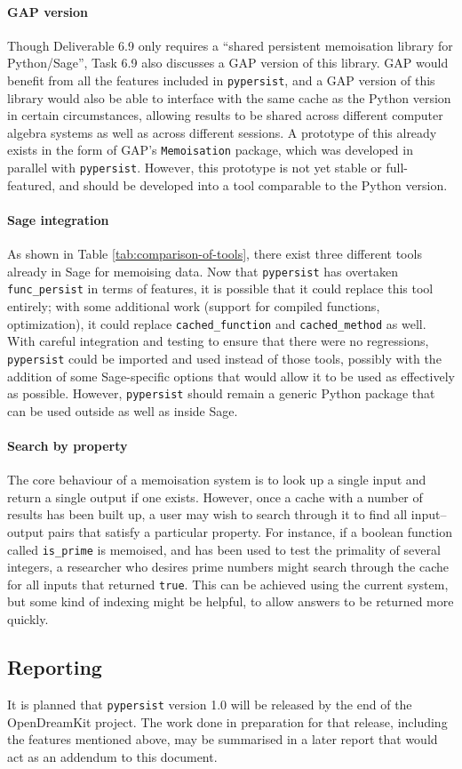 \documentclass{deliverablereport}
\newcommand{\pypersist}{\texttt{pypersist}}
\begin{document}
\paragraph{GAP version}
Though Deliverable 6.9 only requires a ``shared persistent memoisation library
for Python/Sage'', Task 6.9 also discusses a GAP version of this library.  GAP
would benefit from all the features included in \pypersist{}, and a GAP version
of this library would also be able to interface with the same cache as the
Python version in certain circumstances, allowing results to be shared across
different computer algebra systems as well as across different sessions.  A
prototype of this already exists in the form of GAP's \texttt{Memoisation}
package, which was developed in parallel with \pypersist{}.  However, this
prototype is not yet stable or full-featured, and should be developed into a
tool comparable to the Python version.

\paragraph{Sage integration}
As shown in Table \ref{tab:comparison-of-tools}, there exist three different
tools already in Sage for memoising data.  Now that \pypersist{} has overtaken
\texttt{func\_persist} in terms of features, it is possible that it could replace this tool
entirely; with some additional work (support for compiled functions,
optimization), it could replace \texttt{cached\_function} and
\texttt{cached\_method} as well.
With careful integration and testing to ensure that there were no
regressions, \pypersist{} could be imported and used instead of those tools,
possibly with the addition of some Sage-specific options that would allow it to
be used as effectively as possible.  However, \pypersist{} should remain a
generic Python package that can be used outside as well as inside Sage.

\paragraph{Search by property}
The core behaviour of a memoisation system is to look up a single input and
return a single output if one exists.  However, once a cache with a number of
results has been built up, a user may wish to search through it to find all
input--output pairs that satisfy a particular property.  For instance, if a
boolean function called \texttt{is\_prime} is memoised, and has been used to
test the primality of several integers, a researcher who desires prime numbers
might search through the cache for all inputs that returned \texttt{true}.  This
can be achieved using the current system, but some kind of indexing might be
helpful, to allow answers to be returned more quickly.

\subsection{Reporting}
It is planned that \pypersist{} version 1.0 will be released by the end of the
OpenDreamKit project.  The work done in preparation for that release, including
the features mentioned above, may be summarised in a later report that would act
as an addendum to this document.
\end{document}

